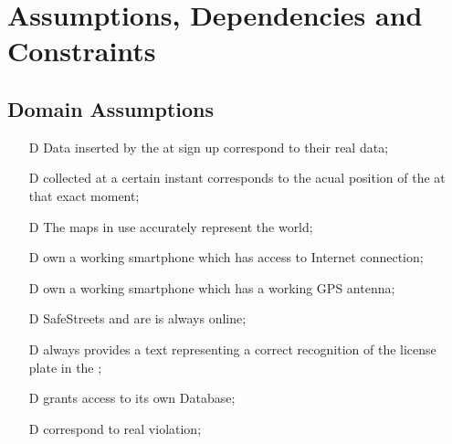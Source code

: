 \documentclass[../../rasd.tex]{subfiles}
\begin{document}
\section{Assumptions, Dependencies and Constraints}
	\subsection{Domain Assumptions}
	 	\begin{itemize}
	 		\item[D\subs{1}]Data inserted by the  at sign up correspond to their real data;
	 		\item[D\subs{2}] collected at a certain instant corresponds to the acual position of the  at that exact moment;
	 		\item[D\subs{3}]The maps in use accurately represent the world;
	 		\item[D\subs{4}] own a working smartphone which has access to Internet connection;
	 		\item[D\subs{5}] own a working smartphone which has a working GPS antenna;
	 		\item[D\subs{6}]SafeStreets and  are is always online;
	 		\item[D\subs{7}] always provides a text representing a correct recognition of the license plate in the ;
	 		\item[D\subs{8}] grants access to its own  Database;
	 		\item[D\subs{9}] correspond to real violation;
	 		
	 		
	 	\end{itemize}
\end{document}
